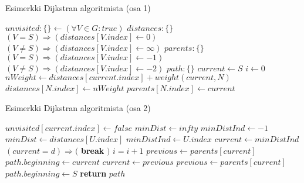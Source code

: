 \begin{algorithm}
\caption{Esimerkki Dijkstran algoritmista (osa 1)}\label{DijkstrEsim}
\begin{algorithmic}
	\State $unvisited: \{ \} \gets (\forall V \in G : true)$
	\State $distances: \{ \}$
		\State $(V = S) \Rightarrow (distances[V.index] \gets 0)$
		\State $(V \neq S) \Rightarrow (distances[V.index] \gets \infty )$
	\EndFor
	\State $parents: \{ \}$
		\State $(V = S) \Rightarrow (distances[V.index] \gets -1)$
		\State $(V \neq S) \Rightarrow (distances[V.index] \gets -2)$
	\EndFor
	\State $path: \{ \}$
	\State $current \gets S$
	\State $i \gets 0$
				\State $nWeight \gets distances[current.index] + weight(current,N)$
					\State $distances[N.index] \gets nWeight$
					\State $parents[N.index] \gets current$

\end{algorithmic}
\end{algorithm}
\begin{algorithm}
\caption{Esimerkki Dijkstran algoritmista (osa 2)}
\begin{algorithmic}

				\EndIf
			\EndIf
		\EndFor
		\State $unvisited[current.index] \gets false$
		\State $minDist \gets infty$
		\State $minDistInd \gets -1$
					\State $minDist \gets distances[U.index]$
					\State $minDistInd \gets U.index$
				\EndIf
			\EndIf
		\EndFor
		\State $current \gets minDistInd$
		\State $(current = d) \Rightarrow ($ \textbf{break} $)$
		\State $i = i+1$
	\EndWhile
	\State $previous \gets parents[current]$
		\State $path.beginning \gets current$
		\State $current \gets previous$
		\State $previous \gets parents[current]$
	\EndWhile
	\State $path.beginning \gets S$
	\State \textbf{return} $path$

\EndProcedure
\end{algorithmic}
\end{algorithm}

